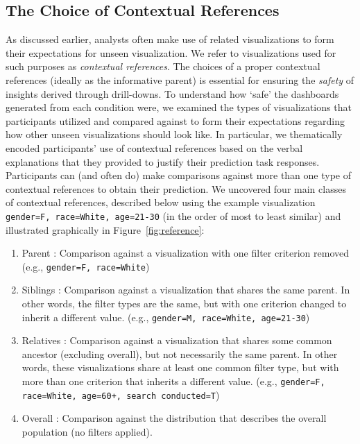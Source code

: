\subsection{The Choice of Contextual References}
\par As discussed earlier, analysts often make use of related visualizations to form their expectations for unseen visualization. We refer to visualizations used for such purposes as \emph{contextual references}. The choices of a proper contextual references (ideally as the informative parent) is essential for ensuring the \emph{safety} of insights derived through drill-downs. To understand how `safe' the dashboards generated from each condition were, we examined the types of visualizations that participants utilized and compared against to form their expectations regarding how other unseen visualizations should look like. In particular, we thematically encoded participants' use of contextual references based on the verbal explanations that they provided to justify their prediction task responses. Participants can (and often do) make comparisons against more than one type of contextual references to obtain their prediction. We uncovered four main classes of contextual references, described below using the example visualization \texttt{gender=F, race=White, age=21-30} (in the order of most to least similar) and illustrated graphically in Figure~\ref{fig:reference}:
\begin{enumerate}
	\item Parent : Comparison against a visualization with one filter criterion removed (e.g., \texttt{gender=F, race=White})
	\item Siblings : Comparison against a visualization that shares the same parent. In other words, the filter types are the same, but with one criterion changed to inherit a different value. (e.g., \texttt{gender=M, race=White, age=21-30})
	\item Relatives : Comparison against a visualization that shares some common ancestor (excluding overall), but not necessarily the same parent. In other words, these visualizations share at least one common filter type, but with more than one criterion that inherits a different value. (e.g., \texttt{gender=F, race=White, age=60+, search conducted=T})
	\item Overall : Comparison against the distribution that describes the overall population (no filters applied).
\end{enumerate}
